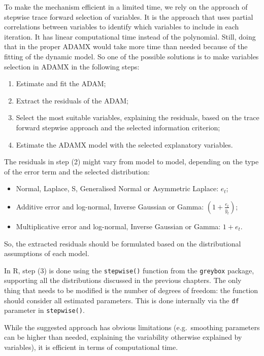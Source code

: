 \documentclass[]{book}
\providecommand{\tightlist}{%
  \setlength{\itemsep}{0pt}\setlength{\parskip}{0pt}}
\theoremstyle{definition}
\theoremstyle{definition}
\theoremstyle{definition}
\theoremstyle{definition}
\theoremstyle{remark}
\begin{document}
To make the mechanism efficient in a limited time, we rely on the \citet{Sagaert2021} approach of stepwise trace forward selection of variables. It is the approach that uses partial correlations between variables to identify which variables to include in each iteration. It has linear computational time instead of the polynomial. Still, doing that in the proper ADAMX would take more time than needed because of the fitting of the dynamic model. So one of the possible solutions is to make variables selection in ADAMX in the following steps:

\begin{enumerate}
\def\labelenumi{\arabic{enumi}.}
\tightlist
\item
  Estimate and fit the ADAM;
\item
  Extract the residuals of the ADAM;
\item
  Select the most suitable variables, explaining the residuals, based on the trace forward stepwise approach and the selected information criterion;
\item
  Estimate the ADAMX model with the selected explanatory variables.
\end{enumerate}

The residuals in step (2) might vary from model to model, depending on the type of the error term and the selected distribution:

\begin{itemize}
\tightlist
\item
  Normal, Laplace, S, Generalised Normal or Asymmetric Laplace: \(e_t\);
\item
  Additive error and log-normal, Inverse Gaussian or Gamma: \(\left(1+\frac{e_t}{\hat{y}_t} \right)\);
\item
  Multiplicative error and log-normal, Inverse Gaussian or Gamma: \(1+e_t\).
\end{itemize}

So, the extracted residuals should be formulated based on the distributional assumptions of each model.

In R, step (3) is done using the \texttt{stepwise()} function from the \texttt{greybox} package, supporting all the distributions discussed in the previous chapters. The only thing that needs to be modified is the number of degrees of freedom: the function should consider all estimated parameters. This is done internally via the \texttt{df} parameter in \texttt{stepwise()}.

While the suggested approach has obvious limitations (e.g.~smoothing parameters can be higher than needed, explaining the variability otherwise explained by variables), it is efficient in terms of computational time.
\end{document}
